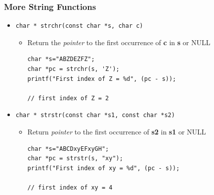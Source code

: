 \documentclass{../c-lecture}
\begin{document}
\begin{frame}[fragile]
  \frametitle{More String Functions}
  \begin{itemize}
    \item
    \begin{verbatim}
char * strchr(const char *s, char c)
    \end{verbatim}
    \begin{itemize}
      \item
        Return the \textit{\color{Cyan} pointer} to the first
        occurrence of \textbf{\color{LimeGreen} c} in
        \textbf{\color{YellowOrange} s} or
        \textsc{\color{Purple} NULL}

      \begin{verbatim}
char *s="ABZDEZFZ";
char *pc = strchr(s, 'Z');
printf("First index of Z = %d", (pc - s));

// first index of Z = 2
      \end{verbatim}
    \end{itemize}
  \end{itemize}
\end{frame}

\begin{frame}[fragile]
  \begin{itemize}
    \item
    \begin{verbatim}
char * strstr(const char *s1, const char *s2)
    \end{verbatim}

    \begin{itemize}
      \item
        Return \textit{\color{Cyan} pointer} to the first occurrence of
        \textbf{\color{LimeGreen} s2} in
        \textbf{\color{YellowOrange} s1} or
        \textsc{\color{Purple} NULL}

      \begin{verbatim}
char *s="ABCDxyEFxyGH";
char *pc = strstr(s, "xy");
printf("First index of xy = %d", (pc - s));

// first index of xy = 4
      \end{verbatim}
    \end{itemize}
  \end{itemize}
\end{frame}
\end{document}
